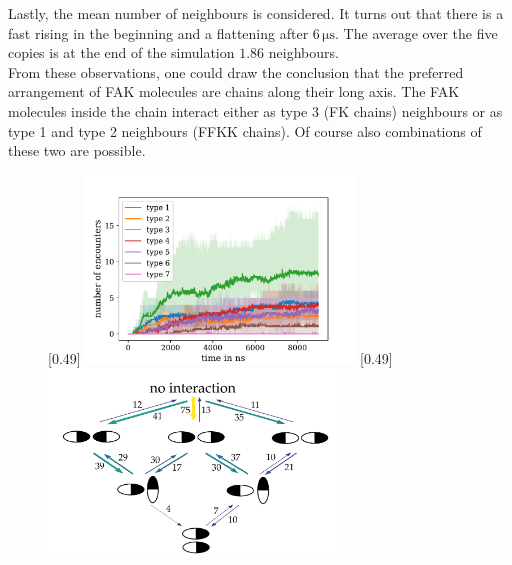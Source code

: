 Lastly, the mean number of neighbours is considered. It turns out that there is a fast rising in the beginning and a flattening after $6\,\si{\micro\second}$. The average over the five copies is at the end of the simulation $1.86$ neighbours.\\
From these observations, one could draw the conclusion that the preferred arrangement of FAK molecules are chains along their long axis. The FAK molecules inside the chain interact either as type 3 (FK chains) neighbours or as type 1 and type 2 neighbours (FFKK chains). Of course also combinations of these two are possible.
%
%
%
\begin{figure}
	\subcaptionbox{\label{mult:inttype_vs_t}}[0.49\textwidth]{
		\includegraphics[height=5cm]{figures/results/multiple_typevstime}
	}\hfill%
	\subcaptionbox{\label{mult:inttype_markov}}[0.49\textwidth]{
		\includegraphics[height=5cm]{figures/results/markov}
	}%
	\label{mult:inttype_both}
\end{figure}
%
%
%
